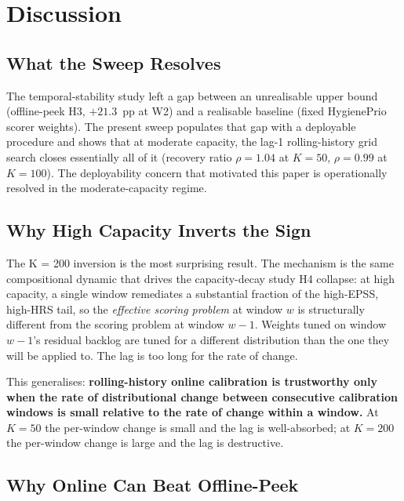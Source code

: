 \section{Discussion}

\subsection{What the Sweep Resolves}

The temporal-stability study left a gap between an unrealisable upper bound (offline-peek
H3, $+21.3$~pp at W2) and a realisable baseline (fixed HygienePrio scorer
weights). The present sweep populates that gap with a deployable
procedure and shows that at moderate capacity, the lag-1 rolling-history
grid search closes essentially all of it (recovery ratio $\rho = 1.04$
at $K = 50$, $\rho = 0.99$ at $K = 100$). The deployability concern
that motivated this paper is operationally resolved in the moderate-capacity
regime.

\subsection{Why High Capacity Inverts the Sign}

The K = 200 inversion is the most surprising result. The mechanism is
the same compositional dynamic that drives the capacity-decay study H4 collapse:
at high capacity, a single window remediates a substantial fraction
of the high-EPSS, high-HRS tail, so the
\textit{effective scoring problem} at window $w$ is structurally
different from the scoring problem at window $w - 1$. Weights tuned
on window $w - 1$'s residual backlog are tuned for a different
distribution than the one they will be applied to. The lag is too
long for the rate of change.

This generalises: \textbf{rolling-history online calibration is
trustworthy only when the rate of distributional change between
consecutive calibration windows is small relative to the rate of
change within a window.} At $K = 50$ the per-window change is
small and the lag is well-absorbed; at $K = 200$ the per-window
change is large and the lag is destructive.

\subsection{Why Online Can Beat Offline-Peek}

